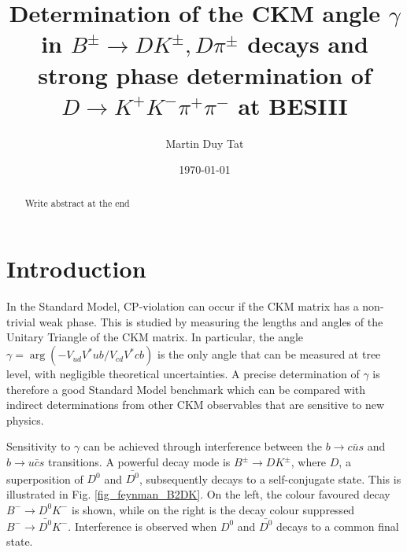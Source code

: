 \documentclass[12pt, a4paper, notitlepage, onecolumn]{article}
\title{Determination of the CKM angle $\gamma$ in $B^\pm\to DK^\pm, D\pi^\pm$ decays and strong phase determination of $D\to K^+K^-\pi^+\pi^-$ at BESIII}
\author{Martin Duy Tat}
\date{\today}
\numberwithin{equation}{section}
\begin{document}
\maketitle
\begin{abstract}
\noindent Write abstract at the end
\end{abstract}
\section{Introduction}
\noindent In the Standard Model, CP-violation can occur if the CKM matrix has a non-trivial weak phase\cite{cite_CKM}. This is studied by measuring the lengths and angles of the Unitary Triangle of the CKM matrix. In particular, the angle $\gamma = \arg(-V_{ud}V^*{ub}/V_{cd}V^*{cb})$ is the only angle that can be measured at tree level, with negligible theoretical uncertainties. A precise determination of $\gamma$ is therefore a good Standard Model benchmark which can be compared with indirect determinations from other CKM observables that are sensitive to new physics.

Sensitivity to $\gamma$ can be achieved through interference between the $b\to c\bar{u}s$ and $b\to u\bar{c}s$ transitions. A powerful decay mode is $B^\pm\to DK^\pm$, where $D$, a superposition of $D^0$ and $\bar{D^0}$, subsequently decays to a self-conjugate state. This is illustrated in Fig. \ref{fig_feynman_B2DK}. On the left, the colour favoured decay $B^-\to D^0K^-$ is shown, while on the right is the decay colour suppressed $B^-\to\bar{D^0}K^-$. Interference is observed when $D^0$ and $\bar{D^0}$ decays to a common final state.
\end{document}
